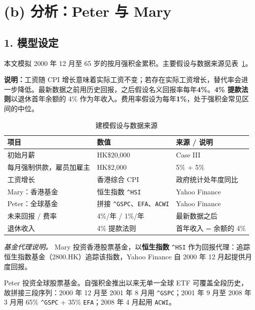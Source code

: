 \documentclass[12pt, letterpaper]{ctexart}
\begin{document}
\section*{(b) 分析：Peter 与 Mary}

\subsection*{1. 模型设定}

本文模拟 2000 年 12 月至 65 岁的按月强积金累积。主要假设与数据来源见表~\ref{tab:assumptions}。

\textbf{说明：}工资随 CPI 增长意味着实际工资不变；若存在实际工资增长，替代率会进一步降低。最新数据之前用历史回报，之后假设名义回报率每年\textbf{4\%}。\textbf{4\% 提款法则}以退休首年余额的 4\% 作为年收入。费用率假设为每年\textbf{1\%}，处于强积金常见区间的中位。

\begin{table}[H]
  \centering
  \caption{建模假设与数据来源}
  \label{tab:assumptions}
  \small
  \begin{tabular}{@{}lll@{}}
    \toprule
    项目 & 数值 & 来源 / 说明 \\
    \midrule
    初始月薪 & HK\$20,000 & Case III \\
    每月强制供款，雇员加雇主 & HK\$2,000 & 5\% + 5\% \\
    工资增长 & 香港综合 CPI & 政府统计处年度同比 \\
    Mary：香港基金 & 恒生指数 \texttt{\^{}HSI} & Yahoo Finance \\
    Peter：全球基金 & 拼接 \texttt{\^{}GSPC}、\texttt{EFA}、\texttt{ACWI} & Yahoo Finance \\
    未来回报 / 费率 & 4\%/年 / 1\%/年 & 最新数据之后 \\
    退休收入 & 4\% 提款法则 & 首年收入 = 余额的 4\% \\
    \bottomrule
  \end{tabular}

  \vspace{0.4em}
  {\footnotesize
  \textit{基金代理说明。} Mary 投资香港股票基金，以\textbf{恒生指数} \texttt{\^{}HSI} 作为回报代理：追踪恒生指数基金（2800.HK）追踪该指数，Yahoo Finance 自 2000 年 12 月起提供月度回报。

  Peter 投资全球股票基金。自强积金推出以来无单一全球 ETF 可覆盖全段历史，故拼接三段序列：2000 年 12 月至 2001 年 8 月用 \texttt{\^{}GSPC}；2001 年 9 月至 2008 年 3 月用 65\% \texttt{\^{}GSPC} + 35\% \texttt{EFA}；2008 年 4 月起用 \texttt{ACWI}。
  }
\end{table}
\end{document}
